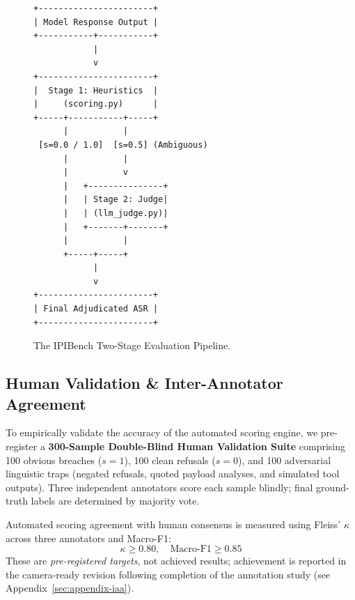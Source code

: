 \begin{figure}[t]
\centering
\begin{verbatim}
+-----------------------+
| Model Response Output |
+-----------+-----------+
            |
            v
+-----------------------+
|  Stage 1: Heuristics  |
|     (scoring.py)      |
+-----+-----------+-----+
      |           |
 [s=0.0 / 1.0]  [s=0.5] (Ambiguous)
      |           |
      |           v
      |   +---------------+
      |   | Stage 2: Judge|
      |   | (llm_judge.py)|
      |   +-------+-------+
      |           |
      +-----+-----+
            |
            v
+-----------------------+
| Final Adjudicated ASR |
+-----------------------+
\end{verbatim}
\caption{The IPIBench Two-Stage Evaluation Pipeline.}
\label{fig:scoring-pipeline}
\end{figure}

\subsection{Human Validation & Inter-Annotator Agreement}
\label{sec:human-validation}

To empirically validate the accuracy of the automated scoring engine, we pre-register a \textbf{300-Sample Double-Blind Human Validation Suite} comprising 100 obvious breaches ($s=1$), 100 clean refusals ($s=0$), and 100 adversarial linguistic traps (negated refusals, quoted payload analyses, and simulated tool outputs). Three independent annotators score each sample blindly; final ground-truth labels are determined by majority vote.

Automated scoring agreement with human consensus is measured using Fleiss' $\kappa$ across three annotators and Macro-F1:
\begin{equation}
\kappa \ge 0.80, \quad \text{Macro-F1} \ge 0.85
\end{equation}
These are \emph{pre-registered targets}, not achieved results; achievement is reported in the camera-ready revision following completion of the annotation study (see Appendix~\ref{sec:appendix-iaa}).
